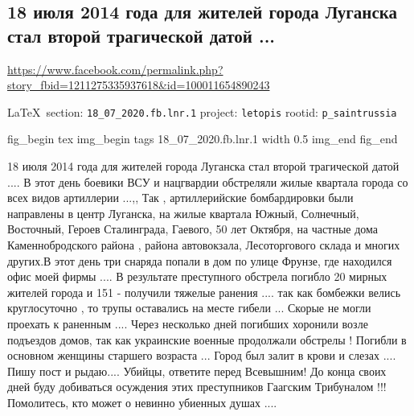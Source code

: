  
 
  
\subsection{18 июля 2014 года для жителей города Луганска стал второй трагической датой ...}
\label{sec:18_07_2020.fb.lnr.1}
\url{https://www.facebook.com/permalink.php?story_fbid=1211275335937618&id=100011654890243}

\vspace{0.5cm}
{\small\LaTeX~section: \verb|18_07_2020.fb.lnr.1| project: \verb|letopis| rootid: \verb|p_saintrussia|}
\vspace{0.5cm}

\ifcmt
fig_begin 
	tex \centering
  img_begin 
    tags 18_07_2020.fb.lnr.1
    width 0.5
  img_end
fig_end
\fi
  
18 июля 2014 года для жителей города Луганска стал второй трагической датой
.... В этот день боевики ВСУ и нацгвардии обстреляли жилые квартала города со
всех видов артиллерии ...,, Так , артиллерийские бомбардировки были направлены
в центр Луганска, на жилые квартала Южный, Солнечный, Восточный, Героев
Сталинграда, Гаевого, 50 лет Октября, на частные дома Каменнобродского района ,
района автовокзала, Лесоторгового склада и многих других.В этот день три
снаряда попали в дом по улице Фрунзе, где находился офис моей фирмы .... В
результате преступного обстрела погибло 20 мирных жителей города и 151 -
получили тяжелые ранения .... так как бомбежки велись круглосуточно , то трупы
оставались на месте гибели ... Скорые не могли проехать к раненным .... Через
несколько дней погибших хоронили возле подъездов домов, так как украинские
военные продолжали обстрелы ! Погибли в основном женщины старшего возраста ...
Город был залит в крови и слезах .... Пишу пост и рыдаю.... Убийцы, ответите
перед Всевышним! До конца своих дней буду добиваться осуждения этих
преступников Гаагским Трибуналом !!! Помолитесь, кто может о невинно убиенных
душах ....
  
